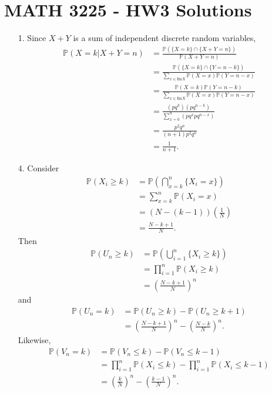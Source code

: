 \documentclass[a4paper,12pt]{article}
\begin{document}
\section*{MATH 3225 - HW3 Solutions}
\begin{enumerate}
    \item[1.]
        Since $X + Y$ is a sum of independent discrete random variables,
        \begin{align*}
            \mathbb{P}(X = k | X + Y = n) &= \frac{\mathbb{P}(\{ X = k \} \cap \{ X + Y = n \})}{\mathbb{P}(X + Y = n)} \\
            &= \frac{\mathbb{P}(\{ X = k \} \cap \{ Y = n - k \})}{\sum_{x \in \text{Im}X} \mathbb{P}(X = x) \mathbb{P}(Y = n - x)} \\
            &= \frac{\mathbb{P}(X = k) \mathbb{P}(Y = n - k) }{\sum_{x \in \text{Im}X} \mathbb{P}(X = x) \mathbb{P}(Y = n - x)} \\
            &= \frac{(pq^k) (pq^{n - k})}{\sum_{x = 0}^{n} (pq^x pq^{n - x})} \\
            &= \frac{p^2 q^n}{(n + 1) p^2 q^n} \\
            &= \frac{1}{n + 1}.
        \end{align*}

    \item[4.]
        Consider
        \begin{align*}
            \mathbb{P}(X_i \geq k) &= \mathbb{P}\left( \bigcap_{x = k}^{n} \{ X_i = x \} \right) \\
            &= \sum_{x = k}^{n} \mathbb{P} (X_i = x) \\
            &= (N - (k - 1))\left( \frac{1}{N} \right) \\
            &= \frac{N - k + 1}{N}.
        \end{align*}
        Then
        \begin{align*}
            \mathbb{P}(U_n \geq k) &= \mathbb{P}\left( \bigcup_{i = 1}^{n} \{ X_i \geq k \} \right) \\
            &= \prod_{i = 1}^{n} \mathbb{P}(X_i \geq k) \\
            &= \left( \frac{N - k + 1}{N} \right)^n
        \end{align*}
        and
        \begin{align*}
            \mathbb{P}(U_n = k) &= \mathbb{P}(U_n \geq k) - \mathbb{P}(U_n \geq k + 1) \\
            &= \left( \frac{N - k + 1}{N} \right)^n - \left( \frac{N - k}{N} \right)^n.
        \end{align*}
        Likewise,
        \begin{align*}
            \mathbb{P}(V_n = k) &= \mathbb{P}(V_n \leq k) - \mathbb{P}(V_n \leq k - 1) \\
            &= \prod_{i = 1}^{n} \mathbb{P}(X_i \leq k) - \prod_{i = 1}^{n} \mathbb{P}(X_i \leq k - 1) \\
            &= \left( \frac{k}{N} \right)^n - \left( \frac{k - 1}{N} \right)^n.
        \end{align*}


\end{enumerate}
\end{document}
